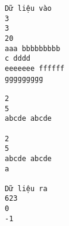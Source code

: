 \begin{verbatim}
Dữ liệu vào
3
3
20
aaa bbbbbbbbb 
c dddd
eeeeeee ffffff
ggggggggg

2
5
abcde abcde

2
5
abcde abcde 
a

Dữ liệu ra
623
0
-1
\end{verbatim}